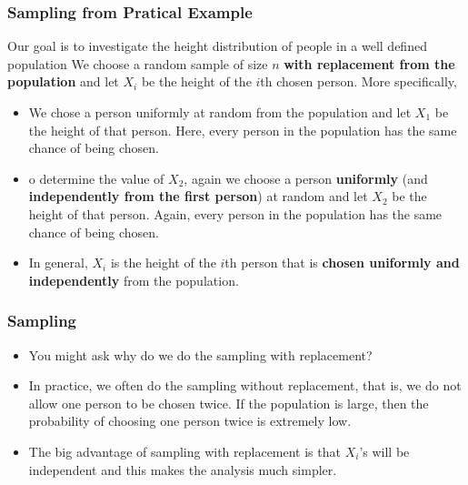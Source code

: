 \begin{frame}
    \frametitle{Sampling from Pratical Example}

    Our goal is to investigate the height distribution of people in a well defined population 
    We choose a random sample of size $n$ \textbf{with replacement from the population} and let $X_i$
    be the height of the $i$th chosen person. More specifically,
    \begin{itemize}
        \item We chose a person uniformly at random from the population and let $X_1$
        be the height of that person. Here, every person in the population has the same chance of being chosen.

        \item o determine the value of $X_2$, again we choose a person \textbf{uniformly} 
        (and \textbf{independently from the first person}) at random and let $X_2$
        be the height of that person. Again, every person in the population has the same chance of being chosen.

        \item In general, $X_i$ is the height of the $i$th person that is \textbf{chosen uniformly and independently} 
        from the population.

    \end{itemize}
\end{frame}



\begin{frame}
    \frametitle{Sampling}

    \begin{itemize}
        \item You might ask why do we do the sampling with replacement?

        \item In practice, we often do the sampling without replacement, that is, we do not allow one person 
        to be chosen twice. If the population is large, then the probability of choosing one person twice is extremely low.

        \item The big advantage of sampling with replacement is that $X_i$'s will be independent and this makes 
        the analysis much simpler.

    \end{itemize}
\end{frame}

